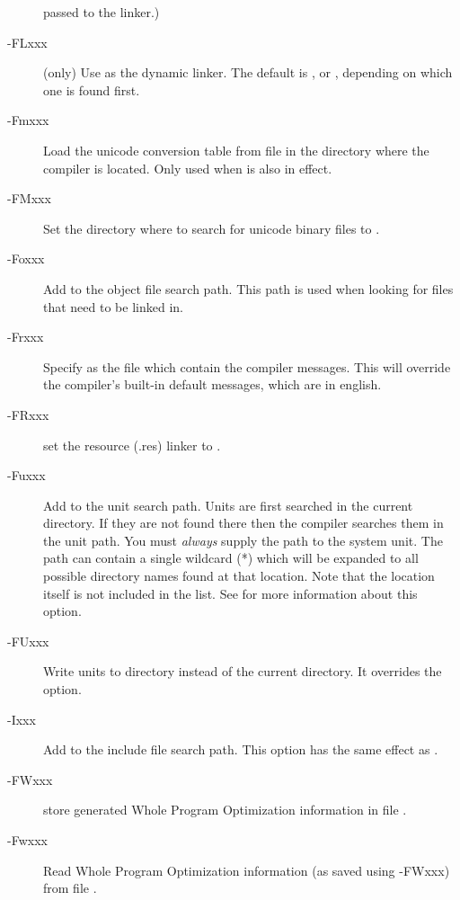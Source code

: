 \begin{description}
passed to the linker.)
\item[-FLxxx] (\linux only) Use  as the dynamic linker. The default is , or
, depending on which one is found first.
\item[-Fmxxx] Load the unicode conversion table from file  in
the directory where the compiler is located. Only used when  is
also in effect.
\item[-FMxxx]  Set the directory where to search for unicode binary files to .
\item[-Foxxx] Add  to the object file search path.
This path is used when looking for files that need to be linked in.
\item [-Frxxx] Specify  as the file which contain the compiler
messages. This will override the compiler's built-in default messages, which
are in english.
\item[-FRxxx] set the resource (.res) linker to .
\item [-Fuxxx] Add  to the unit search path.
Units are first searched in the current directory.
If they are not found there then the compiler searches them in the unit path.
You must {\em always} supply the path to the system unit. The 
path can contain a single wildcard (*) which will be expanded to all
possible directory names found at that location. Note that the location
itself is not included in the list. See  for more
information about this option.
\item [-FUxxx] Write units to directory  instead of the current
directory. It overrides the  option.
\item [-Ixxx]  Add  to the include file search path.
This option has the same effect as .
\item[-FWxxx] store generated Whole Program Optimization information in file
.
\item[-Fwxxx] Read Whole Program Optimization information (as saved using -FWxxx) from file
.
\end{description}

